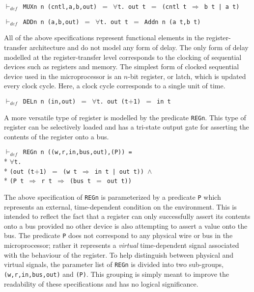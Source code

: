\begin{normalsize}
$\vdash_{def}$\verb" MUXn n (cntl,a,b,out) "$=$\verb" "$\forall$\verb"t. out t "$=$\verb" (cntl t "$\Rightarrow$\verb" b t | a t)"

$\vdash_{def}$\verb" ADDn n (a,b,out) "$=$\verb" "$\forall$\verb"t. out t "$=$\verb" Addn n (a t,b t)"

All of the above specifications represent functional elements
in the register-transfer architecture and
do not model any form of delay.
The only form of delay modelled at the register-transfer level
corresponds to the clocking of sequential devices such as
registers and memory.
The simplest form of clocked sequential device used in the
microprocessor is an \mbox{$n$-bit} register, or latch, which
is updated every clock cycle.
Here, a clock cycle corresponds to a single unit of time.

$\vdash_{def}$\verb" DELn n (in,out) "$=$\verb" "$\forall$\verb"t. out (t"$+$\verb"1) "$=$\verb" in t"

A more versatile type of
register is modelled by the predicate \verb"REGn".
This type of register
can be selectively loaded and has a tri-state output
gate for asserting the contents of the register onto a bus.

\hspace*{\fill}
\begin{minipage}{17cm}
$\vdash_{def}$\verb" REGn n ((w,r,in,bus,out),(P)) ="\\*
$\forall$\verb"t."\\*
\verb"(out (t"$+$\verb"1) "$=$\verb" (w t "$\Rightarrow$\verb" in t | out t)) "$\wedge$\\*
\verb"(P t "$\Longrightarrow$\verb" r t "$\Longrightarrow$\verb" (bus t "$=$\verb" out t))"
\end{minipage}
\hspace*{\fill}

The above specification of \verb"REGn" is parameterized by
a predicate \verb"P" which represents an external, time-dependent
condition on the environment.
This is intended to reflect the fact that a register can only
successfully assert its contents onto a bus provided no
other device is also attempting to assert a value onto
the bus.
The predicate \verb"P" does not correspond to any physical wire or
bus in the microprocessor; rather it represents a {\it virtual}
time-dependent signal associated with the behaviour of the register.
To help distinguish between physical and virtual signals,
the parameter list of \verb"REGn" is divided into two sub-groups,
\verb"(w,r,in,bus,out)" and \verb"(P)".  This grouping is simply
meant to improve the readability of these specifications and has
no logical significance.


\end{normalsize}
